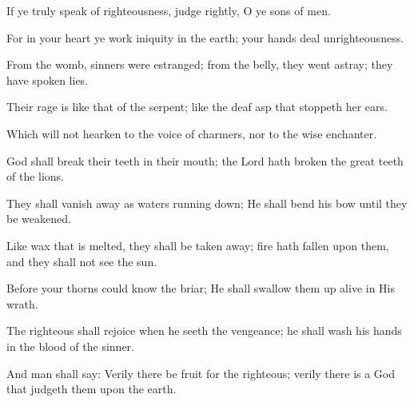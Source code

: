 If ye truly speak of righteousness, judge rightly, O ye sons of men.

For in your heart ye work iniquity in the earth; your hands deal unrighteousness.

From the womb, sinners were estranged; from the belly, they went astray; they have spoken lies.

Their rage is like that of the serpent; like the deaf asp that stoppeth her ears.

Which will not hearken to the voice of charmers, nor to the wise enchanter.

God shall break their teeth in their mouth; the Lord hath broken the great teeth of the lions.

They shall vanish away as waters running down; He shall bend his bow until they be weakened.

Like wax that is melted, they shall be taken away; fire hath fallen upon them, and they shall not see the sun.

Before your thorns could know the briar; He shall swallow them up alive in His wrath.

The righteous shall rejoice when he seeth the vengeance; he shall wash his hands in the blood of the sinner.

And man shall say: Verily there be fruit for the righteous; verily there is a God that judgeth them upon the earth.
